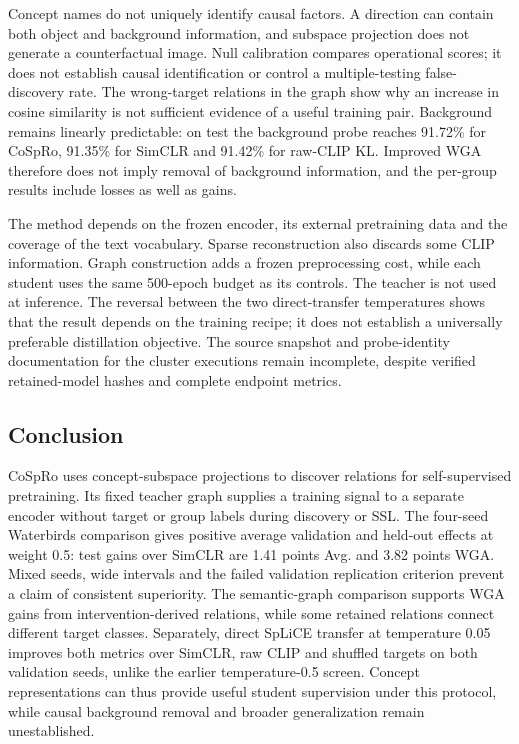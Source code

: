 \documentclass{article}
\begin{document}
Concept names do not uniquely identify causal factors. A direction can contain
both object and background information, and subspace projection does not
generate a counterfactual image. Null calibration compares operational scores;
it does not establish causal identification or control a multiple-testing
false-discovery rate. The wrong-target relations in the graph show why an
increase in cosine similarity is not sufficient evidence of a useful training
pair. Background remains linearly predictable: on test the background probe
reaches 91.72\% for CoSpRo, 91.35\% for SimCLR and 91.42\% for raw-CLIP KL.
Improved WGA therefore does not imply removal of background information,
and the per-group results include losses as well as gains.

The method depends on the frozen encoder, its external pretraining data and the
coverage of the text vocabulary. Sparse reconstruction also discards some CLIP
information. Graph construction adds a frozen preprocessing cost, while each
student uses the same 500-epoch budget as its controls. The teacher is not used
at inference. The reversal between the two direct-transfer temperatures
shows that the result depends on the training recipe; it does not establish
a universally preferable distillation objective. The source snapshot and
probe-identity documentation for the cluster executions remain incomplete,
despite verified retained-model hashes and complete endpoint metrics.

\begin{samepage}
\section{Conclusion}
CoSpRo uses concept-subspace projections to discover relations for
self-supervised pretraining. Its fixed teacher graph supplies a training signal
to a separate encoder without target or group labels during discovery or SSL.
The four-seed Waterbirds comparison gives positive average validation and
held-out effects at weight 0.5: test gains over SimCLR are 1.41 points Avg.
and 3.82 points WGA. Mixed seeds, wide intervals and the failed validation
replication criterion prevent a claim of consistent superiority. The
semantic-graph comparison supports WGA gains from intervention-derived
relations, while some retained relations connect different target classes.
Separately, direct SpLiCE transfer at temperature 0.05 improves both metrics
over SimCLR, raw CLIP and shuffled targets on both validation seeds, unlike
the earlier temperature-0.5 screen. Concept representations can thus provide
useful student supervision under this protocol, while causal background
removal and broader generalization remain unestablished.

\end{samepage}
\end{document}
